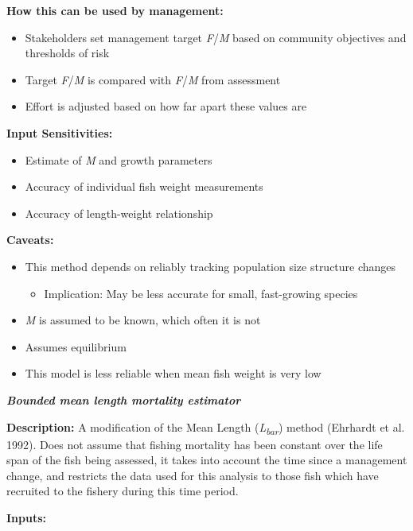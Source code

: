 \documentclass[]{book}
\providecommand{\tightlist}{%
  \setlength{\itemsep}{0pt}\setlength{\parskip}{0pt}}
\begin{document}
\textbf{How this can be used by management: }

\begin{itemize}
\item
  Stakeholders set management target \emph{F}/\emph{M} based on
  community objectives and thresholds of risk
\item
  Target \emph{F}/\emph{M} is compared with \emph{F}/\emph{M} from
  assessment
\item
  Effort is adjusted based on how far apart these values are
\end{itemize}

\textbf{Input Sensitivities: }

\begin{itemize}
\item
  Estimate of \emph{M} and growth parameters
\item
  Accuracy of individual fish weight measurements
\item
  Accuracy of length-weight relationship
\end{itemize}

\textbf{Caveats: }

\begin{itemize}
\item
  This method depends on reliably tracking population size structure
  changes

  \begin{itemize}
  \tightlist
  \item
    Implication: May be less accurate for small, fast-growing species
  \end{itemize}
\item
  \emph{M} is assumed to be known, which often it is not
\item
  Assumes equilibrium
\item
  This model is less reliable when mean fish weight is very low
\end{itemize}

\textbf{\emph{Bounded mean length mortality estimator}}

\textbf{Description:} A modification of the Mean Length
(\emph{L\textsubscript{bar}}) method (Ehrhardt et al. 1992). Does not
assume that fishing mortality has been constant over the life span of
the fish being assessed, it takes into account the time since a
management change, and restricts the data used for this analysis to
those fish which have recruited to the fishery during this time period.

\textbf{Inputs:}
\end{document}

